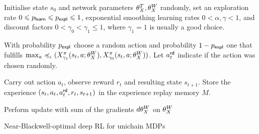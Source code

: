 \documentclass[envcountsame]{llncs}
\begin{document}
\begin{algorithm}[t!]
  \begin{algorithmic}[1]
    \State{}Initialise state \(s_{0}\) and network parameters \(\theta_X^{T}, \theta_X^{W}\) randomly, set
    an exploration rate \(0 \leqslant p_{\mathsf{learn}} \leqslant p_{\mathsf{expl}} \leqslant 1\), exponential smoothing learning rates
    \(0 < \alpha, \gamma < 1\), and discount factors
    \(0 < \gamma_{0} < \gamma_{1} \leqslant 1\), where \(\gamma_{1} = 1\) is
    usually a good choice.
    \State{}\begin{minipage}[t]{\dimexpr\textwidth-\leftmargin-\labelsep-\labelwidth}
      With probability \(p_{\mathsf{expl}}\) choose a random action and
      probability \(1-p_{\mathsf{expl}}\) one that fulfills
      \(\max_{a}\preccurlyeq_{\epsilon}(X^{\pi}_{\gamma_{1}}(s_{t},a; \theta_X^{W}{}),X^\pi_ {\gamma_{0}}(s_{t},a; \theta_X^{W}{}))\). Let
      \(a_{t}^{\mathsf{rd}}\) indicate if the action was chosen randomly.
    \end{minipage}
    \State{}\begin{minipage}[t]{\dimexpr\textwidth-\leftmargin-\labelsep-\labelwidth}
    Carry out action \(a_{t}\), observe reward \(r_{t}\) and resulting state \(s_{t+1}\).
    Store the experience \((s_{t}, a_{t}, a_{t}^{\mathsf{rd}}, r_{t}, s_{t+1})\) in the experience replay
    memory \(M\).
    \end{minipage}
    \EndIf
    \EndFor
    \State{}%
    \begin{minipage}[t]{\dimexpr\textwidth-\leftmargin-\labelsep-\labelwidth}
      Perform update with sum of the gradients \(d\theta_X^{W}{}\) on \(\theta_X^{W}{}\)
    \end{minipage}
    \EndWhile{}
  \end{algorithmic}
  \caption{\label{alg:near}Near-Blackwell-optimal deep RL for unichain MDPs}
\end{algorithm}
\end{document}
